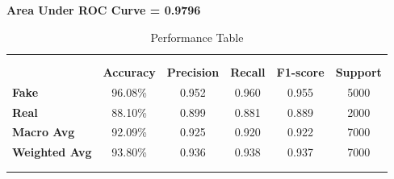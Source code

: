 \begin{enumerate}
			\textbf{Area Under ROC Curve = 0.9796}

\begin{table}[h!]
		\centering
		\begin{tabular}{lccccc}
		\multicolumn{6}{c}{\textbf{}} \\ 
		\multicolumn{6}{c}{\textbf{}} \\ 
		\textbf{} & \textbf{Accuracy} & \textbf{Precision} & \textbf{Recall} & \textbf{F1-score} & \textbf{Support} \\
		\textbf{Fake}  & 96.08\% & 0.952 & 0.960 & 0.955 & 5000 \\
		\textbf{Real} & 88.10\%  & 0.899 & 0.881 & 0.889 & 2000 \\
		\textbf{Macro Avg} & 92.09\% & 0.925 & 0.920 & 0.922 & 7000 \\
		\textbf{Weighted Avg} & 93.80\% & 0.936 & 0.938 & 0.937 &7000 \\ 
		\multicolumn{6}{c}{\textbf{}} \\
		\multicolumn{6}{c}{\textbf{}} \\
		\end{tabular}
		\caption{Performance Table}
		\end{table}
\end{enumerate}

\newpage
